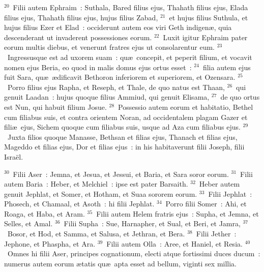 ${}^{20}$~Filii autem Ephraim~: Suthala, Bared filius ejus, Thahath filius ejus, Elada filius ejus, Thahath filius ejus, hujus filius Zabad,
${}^{21}$~et hujus filius Suthula, et hujus filius Ezer et Elad~: occiderunt autem eos viri Geth indigen\ae , quia descenderant ut invaderent possessiones eorum.
${}^{22}$~Luxit igitur Ephraim pater eorum multis diebus, et venerunt fratres ejus ut consolarentur eum.
${}^{23}$~Ingressusque est ad uxorem suam~: qu\ae\ concepit, et peperit filium, et vocavit nomen ejus Beria, eo quod in malis domus ejus ortus esset~:
${}^{24}$~filia autem ejus fuit Sara, qu\ae\ \ae dificavit Bethoron inferiorem et superiorem, et Ozensara.
${}^{25}$~Porro filius ejus Rapha, et Reseph, et Thale, de quo natus est Thaan,
${}^{26}$~qui genuit Laadan~: hujus quoque filius Ammiud, qui genuit Elisama,
${}^{27}$~de quo ortus est Nun, qui habuit filium Josue.
${}^{28}$~Possessio autem eorum et habitatio, Bethel cum filiabus suis, et contra orientem Noran, ad occidentalem plagam Gazer et fili\ae\ ejus, Sichem quoque cum filiabus suis, usque ad Aza cum filiabus ejus.
${}^{29}$~Juxta filios quoque Manasse, Bethsan et filias ejus, Thanach et filias ejus, Mageddo et filias ejus, Dor et filias ejus~: in his habitaverunt filii Joseph, filii Isra\"el.


${}^{30}$~Filii Aser~: Jemna, et Jesua, et Jessui, et Baria, et Sara soror eorum.
${}^{31}$~Filii autem Baria~: Heber, et Melchiel~: ipse est pater Barsaith.
${}^{32}$~Heber autem genuit Jephlat, et Somer, et Hotham, et Suaa sororem eorum.
${}^{33}$~Filii Jephlat~: Phosech, et Chamaal, et Asoth~: hi filii Jephlat.
${}^{34}$~Porro filii Somer~: Ahi, et Roaga, et Haba, et Aram.
${}^{35}$~Filii autem Helem fratris ejus~: Supha, et Jemna, et Selles, et Amal.
${}^{36}$~Filii Supha~: Sue, Harnapher, et Sual, et Beri, et Jamra,
${}^{37}$~Bosor, et Hod, et Samma, et Salusa, et Jethran, et Bera.
${}^{38}$~Filii Jether~: Jephone, et Phaspha, et Ara.
${}^{39}$~Filii autem Olla~: Aree, et Haniel, et Resia.
${}^{40}$~Omnes hi filii Aser, principes cognationum, electi atque fortissimi duces ducum~: numerus autem eorum \ae tatis qu\ae\ apta esset ad bellum, viginti sex millia.

